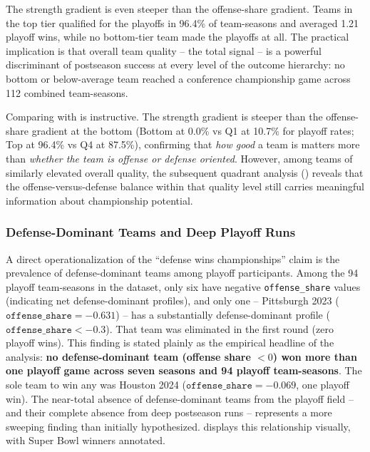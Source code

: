 The \gds{} strength gradient is even steeper than the offense-share gradient.
Teams in the top tier qualified for the playoffs in 96.4\% of team-seasons and
averaged 1.21 playoff wins, while no bottom-tier team made the playoffs at all.
The practical implication is that overall team quality -- the
total \gds{} signal -- is a powerful discriminant of postseason success at
every level of the outcome hierarchy: no bottom or below-average team reached
a conference championship game across 112 combined team-seasons.

Comparing  with  is
instructive. The \gds{} strength gradient is steeper than the offense-share
gradient at the bottom (Bottom at 0.0\% vs Q1 at 10.7\% for playoff rates;
Top at 96.4\% vs Q4 at 87.5\%), confirming that \emph{how good} a team is
matters more than \emph{whether the team is offense or defense oriented}.
However, among teams of similarly elevated overall quality, the subsequent
quadrant analysis () reveals that the
offense-versus-defense balance within that quality level still carries
meaningful information about championship potential.

\subsubsection{Defense-Dominant Teams and Deep Playoff Runs}
\label{sec:myth-check}

A direct operationalization of the ``defense wins championships'' claim is the
prevalence of defense-dominant teams among playoff participants. Among the 94
playoff team-seasons in the dataset, only six have negative
\texttt{offense\_share} values (indicating net defense-dominant profiles),
and only one -- Pittsburgh 2023 ($\texttt{offense\_share} = -0.631$) -- has a
substantially defense-dominant profile ($\texttt{offense\_share} < -0.3$).
That team was eliminated in the first round (zero playoff wins).
This finding is stated plainly as the empirical headline of the analysis:
\textbf{no defense-dominant team (offense share $< 0$) won more than one
playoff game across seven seasons and 94 playoff team-seasons}. The sole
team to win any was Houston 2024 ($\texttt{offense\_share} = -0.069$, one
playoff win).
The near-total absence of defense-dominant teams from the playoff field -- and
their complete absence from deep postseason runs -- represents a more sweeping
finding than initially hypothesized.  displays
this relationship visually, with Super Bowl winners annotated.

